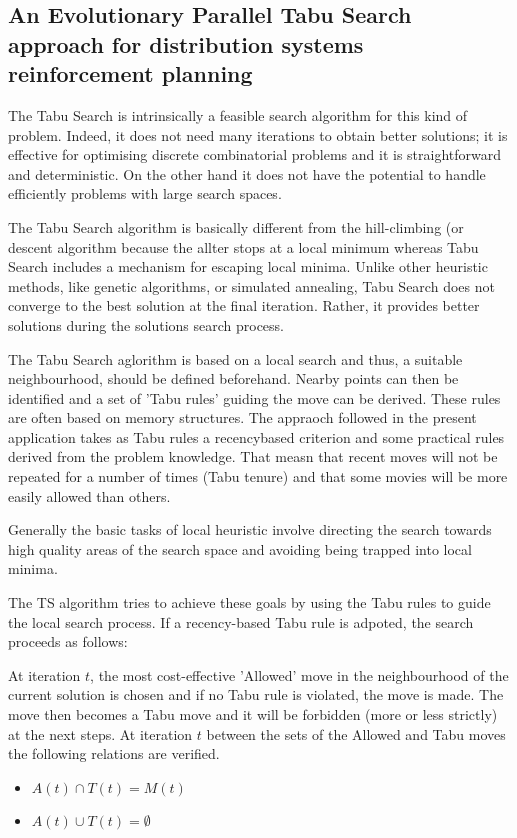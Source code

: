 
\subsection{An Evolutionary Parallel Tabu Search approach for distribution systems reinforcement planning}
The Tabu Search is intrinsically a feasible search algorithm for this kind of problem. Indeed, it does not need many iterations to obtain better solutions; it is effective for optimising discrete combinatorial problems and it is straightforward and deterministic. On the other hand it does not have the potential to handle efficiently problems with large search spaces.

The Tabu Search algorithm is basically different from the hill-climbing (or descent algorithm because the allter stops at a local minimum whereas Tabu Search includes a mechanism for escaping local minima. Unlike other heuristic methods, like genetic algorithms, or simulated annealing, Tabu Search does not converge to the best solution at the final iteration. Rather, it provides better solutions during the solutions search process.

The Tabu Search aglorithm is based on a local search and thus, a suitable neighbourhood, should be defined beforehand. Nearby points can then be identified and a set of 'Tabu rules' guiding the move can be derived. These rules are often based on memory structures. The appraoch followed in the present application takes as Tabu rules a recencybased criterion and some practical rules derived from the problem knowledge. That measn that recent moves will not be repeated for a number of times (Tabu tenure) and that some movies will be more easily allowed than others.

Generally the basic tasks of local heuristic involve directing the search towards high quality areas of the search space and avoiding being trapped into local minima.

The TS algorithm tries to achieve these goals by using the Tabu rules to guide the local search process. If a recency-based Tabu rule is adpoted, the search proceeds as follows:

At iteration $t$, the most cost-effective 'Allowed' move in the neighbourhood of the current solution is chosen and if no Tabu rule is violated, the move is made. The move then becomes a Tabu move and it will be forbidden (more or less strictly) at the next steps. At iteration $t$ between the sets of the Allowed and Tabu moves the following relations are verified.
\begin{itemize}
\item $A(t) \cap T(t) = M(t)$
\item $A(t) \cup T(t) = \emptyset$
\end{itemize}

